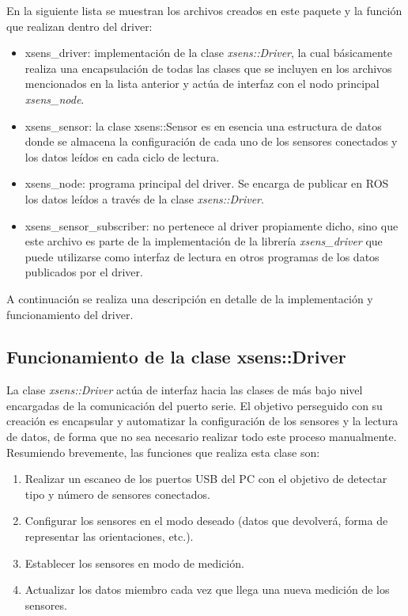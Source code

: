\documentclass[12pt, a4paper]{report}
\begin{document}
En la siguiente lista se muestran los archivos creados en este paquete y la función que realizan dentro del driver:

\begin{itemize}
\item xsens\_driver: implementación de la clase \textit{xsens::Driver}, la cual básicamente realiza una encapsulación de todas las clases que se incluyen en los archivos mencionados en la lista anterior y actúa de interfaz con el nodo principal \textit{xsens\_node}.
\item xsens\_sensor: la clase xsens::Sensor es en esencia una estructura de datos donde se almacena la configuración de cada uno de los sensores conectados y los datos leídos en cada ciclo de lectura.
\item xsens\_node: programa principal del driver. Se encarga de publicar en ROS los datos leídos a través de la clase \textit{xsens::Driver}.
\item xsens\_sensor\_subscriber: no pertenece al driver propiamente dicho, sino que este archivo es parte de la implementación de la librería \textit{xsens\_driver} que puede utilizarse como interfaz de lectura en otros programas de los datos publicados por el driver.
\end{itemize}

A continuación se realiza una descripción en detalle de la implementación y funcionamiento del driver.

\subsection{Funcionamiento de la clase xsens::Driver}

La clase \textit{xsens::Driver} actúa de interfaz hacia las clases de más bajo nivel encargadas de la comunicación del puerto serie. El objetivo perseguido con su creación es encapsular y automatizar la configuración de los sensores y la lectura de datos, de forma que no sea necesario realizar todo este proceso manualmente. Resumiendo brevemente, las funciones que realiza esta clase son:

\begin{enumerate}

\item Realizar un escaneo de los puertos USB del PC con el objetivo de detectar tipo y número de sensores conectados.

\item Configurar los sensores en el modo deseado (datos que devolverá, forma de representar las orientaciones, etc.).

\item Establecer los sensores en modo de medición.

\item Actualizar los datos miembro cada vez que llega una nueva medición de los sensores.

\end{enumerate}
\end{document}
